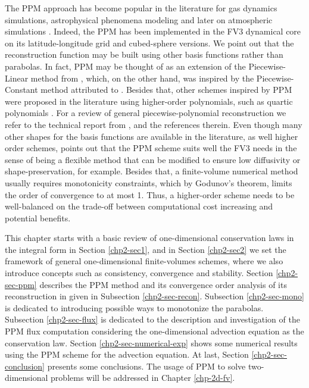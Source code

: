 The PPM approach has become popular in the literature for gas 
dynamics simulations, astrophysical phenomena modeling \citep{woodward:1986}
and later on atmospheric simulations \citep{carpenter:1990}.
Indeed, the PPM has been implemented in the FV3 dynamical core on its 
latitude-longitude grid \citep{lin:2004} and cubed-sphere \citep{putman:2007}
versions.
We point out that the reconstruction function may be built using other basis 
functions rather than parabolas. In fact, PPM may be thought of as an extension of 
the Piecewise-Linear method from \citet{vanleer:1977}, which, on the other hand,
was inspired by the Piecewise-Constant method attributed to \citet{godunov:1959}.
Besides that, other schemes inspired by PPM were proposed in the literature using
higher-order polynomials, such as quartic polynomials \citep{white:2008}.
For a review of general piecewise-polynomial reconstruction we refer 
to the technical report from \citet{engwirda:2016}, \citet{lauritzen:2011}
and the references therein.
Even though many other shapes for the basis functions are available in the 
literature, as well higher order schemes, \citet{harris:2021} points out that the PPM
scheme suits well the FV3 needs in the sense of being a flexible method 
that can be modified to ensure low diffusivity or shape-preservation, for example.
Besides that, a finite-volume numerical method usually requires
monotonicity constraints, which by Godunov's theorem, limits 
the order of convergence to at most 1.
Thus, a higher-order scheme needs to be well-balanced on the trade-off between 
computational cost increasing and potential benefits.


This chapter starts with a basic review of one-dimensional conservation laws in
the integral form in Section \ref{chp2-sec1}, and in Section \ref{chp2-sec2} 
we set the framework of general one-dimensional finite-volumes schemes,
where we also introduce concepts such as consistency, convergence and stability.
Section \ref{chp2-sec-ppm} describes the PPM method and its convergence order analysis
of its reconstruction in given in Subsection \ref{chp2-sec-recon}.
Subsection \ref{chp2-sec-mono} is dedicated to introducing possible ways to monotonize
the parabolas.
Subsection \ref{chp2-sec-flux} is dedicated to the description and investigation of the PPM flux
computation considering the one-dimensional advection equation as the conservation law.
Section \ref{chp2-sec-numerical-exp} shows some numerical results using the PPM scheme
for the advection equation.  At last, Section \ref{chp2-sec-conclusion} presents
some conclusions.
The usage of PPM to solve two-dimensional problems
will be addressed in Chapter \ref{chp-2d-fv}.

